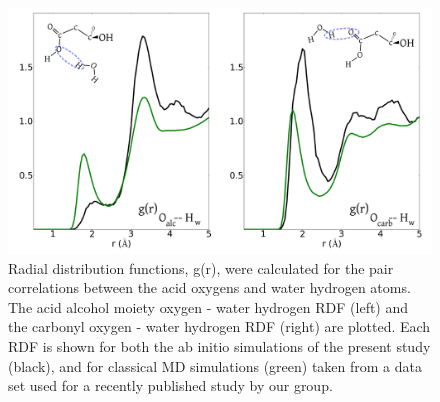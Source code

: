 

\begin{figure}[h!]
	\begin{center}
		\includegraphics[scale=1.0]{images/rdf/MalonicRDF-small.png}
		\caption{Radial distribution functions, g(r), were calculated for the pair correlations between the acid oxygens and water hydrogen atoms. The acid alcohol moiety oxygen - water hydrogen RDF (left) and the carbonyl oxygen - water hydrogen RDF (right) are plotted. Each RDF is shown for both the ab initio simulations of the present study (black), and for classical MD simulations (green) taken from a data set used for a recently published study by our group.\cite{Blower2012}}
		\label{fig:rdf}
	\end{center}
\end{figure}

